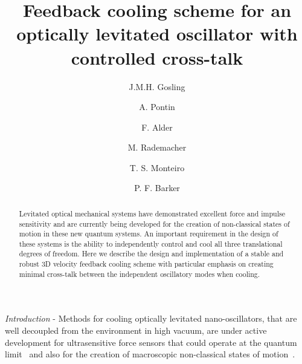 \documentclass[aps,pra,twocolumn,nopacs,superscriptaddress,groupedaddress]{revtex4}
\begin{document}
\title[]{Feedback cooling scheme for an optically levitated oscillator with controlled cross-talk}

\author{J.M.H. Gosling}%
%

\author{A. Pontin}

\author{F. Alder}

\author{M. Rademacher}

\author{T. S. Monteiro}%
%

\author{P. F. Barker}
%



\begin{abstract}
Levitated optical mechanical systems have demonstrated excellent force and impulse sensitivity and are currently being developed for the creation of non-classical states of motion in these new quantum systems. An important requirement in the design of these systems is the ability to independently control and cool all three translational degrees of freedom. Here we describe the design and implementation of a stable and robust 3D velocity feedback cooling scheme with particular emphasis on creating minimal cross-talk between the independent oscillatory modes when cooling. 
\end{abstract}

\maketitle

\emph{Introduction} - Methods for cooling optically levitated nano-oscillators, that are well decoupled from the environment in high vacuum, are under active development for ultrasensitive force sensors that could operate at the quantum limit~\cite{liang2023yoctonewton,ranjit2016zeptonewton} and also for the creation of macroscopic non-classical states of motion~\cite{Magrini2021real,Novotny2021quantum,piotrowski2023simultaneous,delic2020cooling,dania2024high}.  
\end{document}
